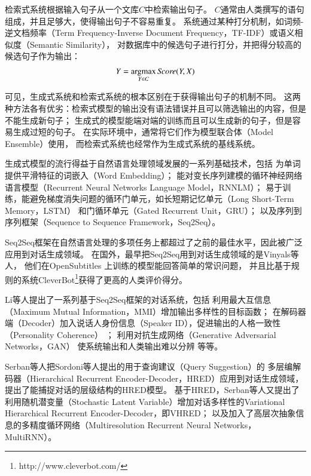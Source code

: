 检索式系统根据输入句子从一个文库$C$中检索输出句子。
$C$通常由人类撰写的语句组成，并且足够大，使得输出句子不容易重复。
系统通过某种打分机制，如词频-逆文档频率（Term Frequency-Inverse Document Frequency，TF-IDF）或语义相似度（Semantic Similarity），
对数据库中的候选句子进行打分，并把得分较高的候选句子作为输出：
\begin{align}
    Y = \operatorname*{argmax}_{Y\in C} \textit{Score}(Y, X)
\end{align}

可见，生成式系统和检索式系统的根本区别在于获得输出句子的机制不同。
这两种方法各有优劣：检索式模型的输出没有语法错误并且可以筛选输出的内容，但是不能生成新句子；
生成式的模型能端对端的训练而且可以生成新的句子，但是容易生成过短的句子。
在实际环境中，通常将它们作为模型联合体（Model Ensemble）使用，
而检索式系统也经常作为生成式系统的基线系统。

生成式模型的流行得益于自然语言处理领域发展的一系列基础技术，包括
为单词提供平滑特征的词嵌入（Word Embedding）；
能对变长序列建模的循环神经网络语言模型（Recurrent Neural Networks Language Model，RNNLM）；
易于训练，能避免梯度消失问题的循环门单元，如长短期记忆单元（Long Short-Term Memory，LSTM）
和门循环单元（Gated Recurrent Unit，GRU）；
以及序列到序列框架（Sequence to Sequence Framework，Seq2Seq）。

Seq2Seq框架在自然语言处理的多项任务上都超过了之前的最佳水平，因此被广泛应用到对话生成领域。
在国外，最早把Seq2Seq用到对话生成领域的是Vinyals等人，
他们在OpenSubtitles
上训练的模型能回答简单的常识问题，
并且比基于规则的系统CleverBot\footnote{http://www.cleverbot.com/}获得了更高的人类评价得分。

Li等人提出了一系列基于Seq2Seq框架的对话系统，包括
利用最大互信息（Maximum Mutual Information，MMI）增加输出多样性的目标函数；
在解码器端（Decoder）加入说话人身份信息（Speaker ID），促进输出的人格一致性（Personality Coherence）
；
利用对抗生成网络（Generative Adversarial Networks，GAN）
使系统输出和人类输出难以分辨 等等。

Serban等人把Sordoni等人提出的用于查询建议（Query Suggestion）的
多层编解码器（Hierarchical Recurrent Encoder-Decoder，HRED）应用到对话生成领域，
提出了能捕捉对话的层级结构的HRED模型。
基于HRED，Serban等人又提出了利用随机潜变量（Stochastic Latent Variable）增加对话多样性的Variational Hierarchical Recurrent Encoder-Decoder，即VHRED；
以及加入了高层次抽象信息的多精度循环网络（Multiresolution Recurrent Neural Networks，MultiRNN）。

